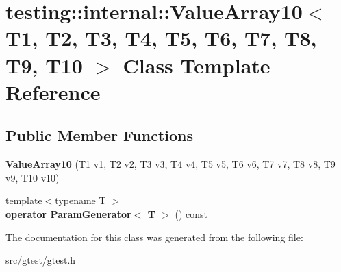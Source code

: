 \hypertarget{classtesting_1_1internal_1_1_value_array10}{}\section{testing\+:\+:internal\+:\+:Value\+Array10$<$ T1, T2, T3, T4, T5, T6, T7, T8, T9, T10 $>$ Class Template Reference}
\label{classtesting_1_1internal_1_1_value_array10}
\subsection*{Public Member Functions}
\begin{DoxyCompactItemize}
\item 
\mbox{\label{classtesting_1_1internal_1_1_value_array10_a763527165bcd1d8e7c366f979b76736b}} 
{\bfseries Value\+Array10} (T1 v1, T2 v2, T3 v3, T4 v4, T5 v5, T6 v6, T7 v7, T8 v8, T9 v9, T10 v10)
\item 
\mbox{\label{classtesting_1_1internal_1_1_value_array10_afa8855c713997ae82781159f3a3d53fc}} 
{\footnotesize template$<$typename T $>$ }\\{\bfseries operator Param\+Generator$<$ T $>$} () const
\end{DoxyCompactItemize}


The documentation for this class was generated from the following file\+:\begin{DoxyCompactItemize}
\item 
src/gtest/gtest.\+h\end{DoxyCompactItemize}
